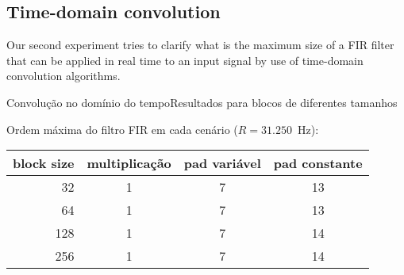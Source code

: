 %                                                       
\subsection{Time-domain convolution}

Our second experiment tries to clarify what is the maximum size of a FIR
filter that can be applied in real time to an input signal by use of
time-domain convolution algorithms.


{Convolução no domínio do tempo}{Resultados para blocos de diferentes tamanhos}



Ordem máxima do filtro FIR em cada cenário ($R=31.250$~Hz):

\begin{center}
\begin{tabular}{rccc}
\toprule
\toprule
\footnotesize{block size}  & \footnotesize{multiplicação} & \footnotesize{pad variável} & \footnotesize{pad constante} \\
\midrule
32  & 1 & 7 & 13 \\
64  & 1 & 7 & 13 \\
128 & 1 & 7 & 14 \\
256 & 1 & 7 & 14 \\
\bottomrule
\end{tabular}
\end{center}



%

